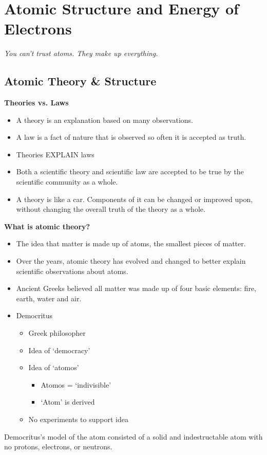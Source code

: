 \documentclass[../hchem.tex]{subfiles}
\begin{document}
\chapter{Atomic Structure and Energy of Electrons}
\textit{You can't trust atoms. They make up everything.}

\section{Atomic Theory \& Structure}
\textbf{Theories vs. Laws}
\begin{itemize}
    \item A theory is an explanation based on many observations.
    \item A law is a fact of nature that is observed so often it is accepted as truth.
    \item Theories EXPLAIN laws
\end{itemize}
\begin{itemize}
    \item Both a scientific theory and scientific law are accepted to be true by the scientific community as a whole.
    \item A theory is like a car. Components of it can be changed or improved upon, without changing the overall truth of the theory as a whole.
\end{itemize}

\textbf{What is atomic theory?}
\begin{itemize}
    \item The idea that matter is made up of atoms, the smallest pieces of matter.
    \item Over the years, atomic theory has evolved and changed to better explain scientific observations about atoms.
\end{itemize}

\begin{itemize}
    \item Ancient Greeks believed all matter was made up of four basic elements: fire, earth, water and air.
    \item Democritus 
    \begin{itemize}
        \item Greek philosopher
        \item Idea of `democracy'
        \item Idea of `atomos'
        \begin{itemize}
            \item Atomos = `indivisible'
            \item `Atom' is derived 
        \end{itemize}
        \item No experiments to support idea
    \end{itemize}
\end{itemize}
Democritus's model of the atom consisted of a solid and indestructable atom with no protons, electrons, or neutrons.
\end{document}
